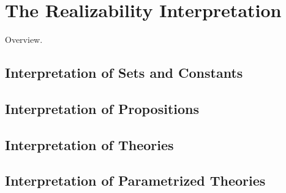 \chapter{The Realizability Interpretation}
\label{cha:real-interp}

Overview.


\section{Interpretation of Sets and Constants}
\label{sec:interpr-sets-const}


\section{Interpretation of Propositions}
\label{sec:interpr-prop}


\section{Interpretation of Theories}
\label{sec:interpr-theor}


\section{Interpretation of Parametrized Theories}
\label{sec:interpr-param-theor}





